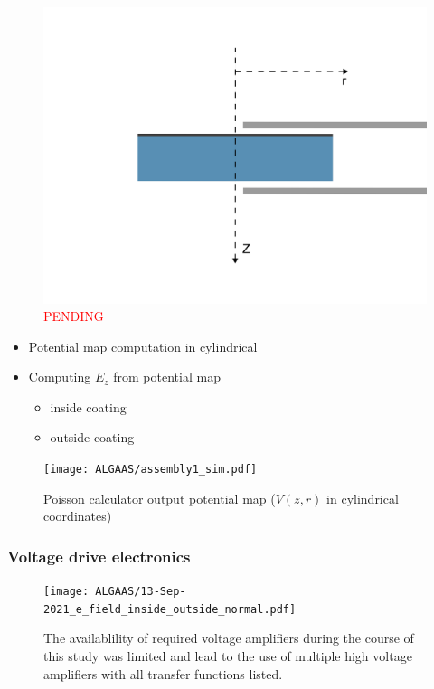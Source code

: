 \begin{figure}[H]
  \centering
  \includegraphics[width=.65\textwidth]{figs/ALGAAS/laplace_coord_test.pdf}
  \caption{\textcolor{red}{PENDING}}
  \label{fig:laplace_coords}
\end{figure}


\begin{itemize}
\item Potential map computation in cylindrical
\item Computing $E_z$ from potential map
\begin{itemize}
\item inside coating
\item outside coating
\end{itemize}
\end{itemize}


\begin{figure}[H]
  \texttt{[image: ALGAAS/assembly1\_sim.pdf]}
  \caption{Poisson calculator output potential map ($V(z,r)$ in cylindrical coordinates)}
  \label{fig:poisson_calc_output}
\end{figure}

\subsubsection{Voltage drive electronics}

\begin{figure}[H]
    \texttt{[image: ALGAAS/13-Sep-2021\_e\_field\_inside\_outside\_normal.pdf]}
    \caption{The availablility of required voltage amplifiers during the course of this study was limited and lead to the use of multiple high voltage amplifiers with all transfer functions listed.}
\label{fig:Ez}
\end{figure}



